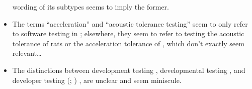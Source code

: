 \begin{itemize}
            wording of its subtypes \citep[p.~25]{Firesmith2015} seems to imply
            the former.
            \ifnotpaper
      \item %
            The terms ``acceleration'' and ``acoustic tolerance testing'' seem
            to only refer to software testing in \citep[p.~56]{Firesmith2015};
            elsewhere, they seem to refer to testing the acoustic tolerance of
            rats \citep{HolleyEtAl1996} or the acceleration tolerance of
            \accelTolTest{}, which don't exactly seem relevant\dots\fi
      \item %
            The distinctions between development testing \citep[p.~136]{IEEE2017},
            developmental testing \citep[p.~30]{Firesmith2015}, and developer
            testing
            \ifnotpaper
                  (\citealp[p.~39]{Firesmith2015}; \citealp[p.~11]{Gerrard2000a})
            \else
                  \cite[p.~39]{Firesmith2015}, \cite[p.~11]{Gerrard2000a}
            \fi are unclear and seem miniscule.
            \ifnotpaper
\end{itemize}

